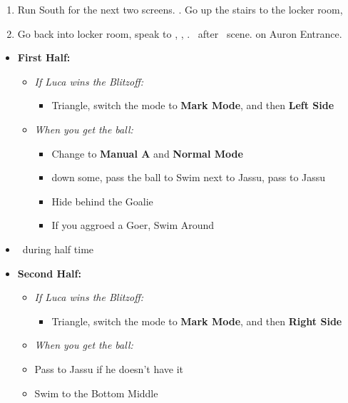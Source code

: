 \begin{enumerate}[resume]
	\item Run South for the next two screens. \save. Go up the stairs to the locker room, \sd
	\item Go back into locker room, speak to \wakka, \sd, \cs[1:20]. \sd\ after \lulu\ scene. \cs[1:40] on Auron Entrance.
\end{enumerate}
\vfill
\begin{blitzball}
	\begin{itemize}
		\item \textbf{First Half:}
		      \begin{itemize}
			      \item \textit{If Luca wins the Blitzoff:}
			            \begin{itemize}
				            \item Triangle, switch the mode to \textbf{Mark Mode}, and then \textbf{Left Side}
			            \end{itemize}
			      \item \textit{When you get the ball:}
			            \begin{itemize}
				            \item Change to \textbf{Manual A} and \textbf{Normal Mode}
				            \item down some, pass the ball to \tidus
				                  \tidusf Swim next to Jassu, pass to Jassu
				            \item Hide behind the Goalie
				            \item If you aggroed a Goer, Swim Around
			            \end{itemize}
		      \end{itemize}
		\item \sd\ during half time
		\item \textbf{Second Half:}
		      \begin{itemize}
			      \item \textit{If Luca wins the Blitzoff:}
			            \begin{itemize}
				            \item Triangle, switch the mode to \textbf{Mark Mode}, and then \textbf{Right Side}
			            \end{itemize}
			      \item \textit{When you get the ball:}
			      \item Pass to Jassu if he doesn't have it
			      \item Swim to the Bottom Middle

\end{itemize}
\end{itemize}
\end{blitzball}
